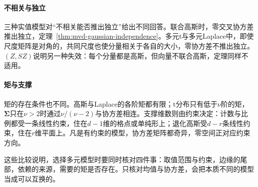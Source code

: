 \paragraph{不相关与独立}
三种实值模型对“不相关能否推出独立”给出不同回答。联合高斯时，零交叉协方差推出独立，定理~\ref{thm:mvd-gaussian-independence}。多元t与多元Laplace中，即使尺度矩阵是对角的，共同尺度也使分量相关于各自的大小，零协方差不推出独立。$(Z,SZ)$说明另一种失效：每个分量都是高斯，但向量不联合高斯，定理同样不适用。

\paragraph{矩与支撑}
矩的存在条件也不同。高斯与Laplace的各阶矩都有限；t分布只有低于$\nu$阶的矩，$\bm{\Sigma}$只在$\nu>2$时通过$\nu/(\nu-2)$与协方差相连。支撑维数则由约束决定：计数与比例都受一条线性约束，住在$d-1$维的格点或单纯形上；退化高斯受$d-r$条线性约束，住在$r$维平面上。凡是有约束的模型，协方差矩阵都奇异，零空间正对应约束方向。

这些比较说明，选择多元模型时要同时核对四件事：取值范围与约束，边缘的尾部，依赖的来源，需要的矩是否存在。只核对均值与协方差，会把本质不同的模型当成可以互换的。
